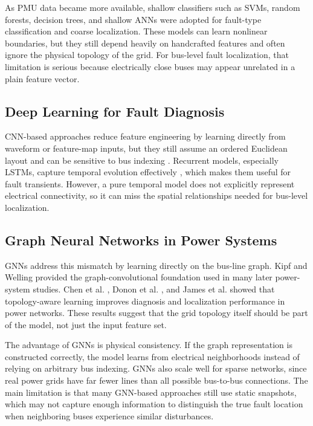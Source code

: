 \documentclass[conference]{IEEEtran}
\begin{document}
As PMU data became more available, shallow classifiers such as SVMs, random forests,
decision trees, and shallow ANNs were adopted for fault-type classification and coarse
localization. These models can learn nonlinear boundaries, but they still depend heavily on
handcrafted features and often ignore the physical topology of the grid. For bus-level fault
localization, that limitation is serious because electrically close buses may appear unrelated
in a plain feature vector.

\subsection{Deep Learning for Fault Diagnosis}
CNN-based approaches reduce feature engineering by learning directly from waveform or
feature-map inputs, but they still assume an ordered Euclidean layout and can be sensitive
to bus indexing \cite{owerko2020}. Recurrent models, especially LSTMs, capture temporal
evolution effectively \cite{hochreiter1997}, which makes them useful for fault transients.
However, a pure temporal model does not explicitly represent electrical connectivity, so it
can miss the spatial relationships needed for bus-level localization.

\subsection{Graph Neural Networks in Power Systems}
GNNs address this mismatch by learning directly on the bus-line graph. Kipf and Welling
\cite{kipf2017} provided the graph-convolutional foundation used in many later power-system
studies. Chen et al. \cite{chen2020}, Donon et al. \cite{donon2019}, and James et al.
\cite{james2020} showed that topology-aware learning improves diagnosis and localization
performance in power networks. These results suggest that the grid topology itself should
be part of the model, not just the input feature set.

The advantage of GNNs is physical consistency. If the graph representation is constructed
correctly, the model learns from electrical neighborhoods instead of relying on arbitrary bus
indexing. GNNs also scale well for sparse networks, since real power grids have far fewer
lines than all possible bus-to-bus connections. The main limitation is that many GNN-based
approaches still use static snapshots, which may not capture enough information to
distinguish the true fault location when neighboring buses experience similar disturbances.
\end{document}
